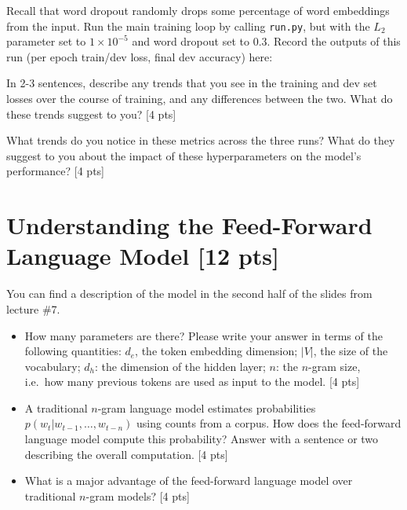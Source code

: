 \documentclass[11pt]{article}
\begin{document}
\vspace{2em}
 Recall that word dropout randomly drops some percentage of word embeddings from the input.
Run the main training loop by calling \texttt{run.py}, but with the $L_2$ parameter set to $1\times10^{-5}$ and word dropout set to $0.3$.  Record the outputs of this run (per epoch train/dev loss, final dev accuracy) here:

\vspace{2em}
\noindent In 2-3 sentences, describe any trends that you see in the training and dev set losses over the course of training, and any differences between the two.  What do these trends suggest to you? \hfill [4 pts]


\vspace{2em}
 What trends do you notice in these metrics across the three runs?  What do they suggest to you about the impact of these hyperparameters on the model's performance? \hfill [4 pts]

\section{Understanding the Feed-Forward Language Model [12 pts]}
You can find a description of the model in the second half of the slides from lecture \#7.
\begin{itemize}
  \item How many parameters are there?  Please write your answer in terms of the following quantities: $d_e$, the token embedding dimension; $|V|$, the size of the vocabulary; $d_h$: the dimension of the hidden layer; $n$: the $n$-gram size, i.e.\ how many previous tokens are used as input to the model. [4 pts]
  \item A traditional $n$-gram language model estimates probabilities $p(w_t | w_{t-1} , \dots , w_{t-n})$ using counts from a corpus.  How does the feed-forward language model compute this probability?  Answer with a sentence or two describing the overall computation. [4 pts]
  \item What is a major advantage of the feed-forward language model over traditional $n$-gram models? [4 pts]
\end{itemize}
\end{document}
